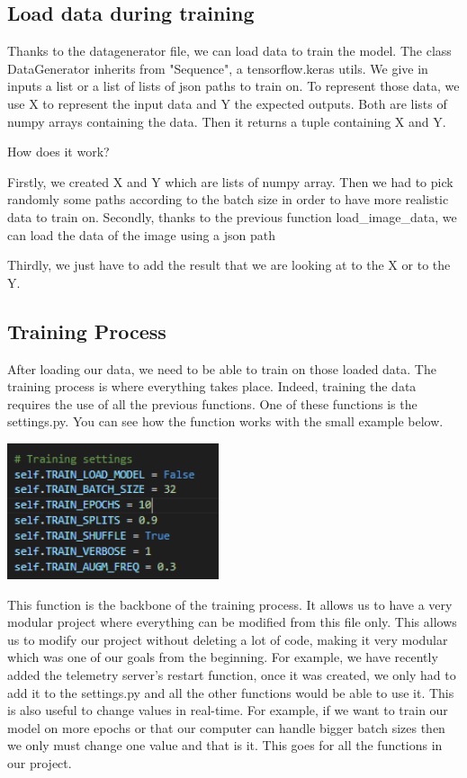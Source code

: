 \documentclass[12pt]{article}
\begin{document}
\subsection{Load data during training}
Thanks to the datagenerator file, we can load data to train the model. The class DataGenerator inherits from "Sequence", a tensorflow.keras utils. We give in inputs a list or a list of lists of json paths to train on. To represent those data, we use X to represent the input data and Y the expected outputs. Both are lists of numpy arrays containing the data. Then it returns a tuple containing X and Y.  

How does it work?  

Firstly, we created X and Y which are lists of numpy array. Then we had to pick randomly some paths according to the batch size in order to have more realistic data to train on. Secondly, thanks to the previous function load\_image\_data, we can load the data of the image using a json path

Thirdly, we just have to add the result that we are looking at to the X or to the Y.

\newpage 

\subsection{Training Process}

After loading our data, we need to be able to train on those loaded data. The training process is where everything takes place. Indeed, training the data requires the use of all the previous functions. One of these functions is the settings.py. You can see how the function works with the small example below.\\

\centerline{\includegraphics[height=4cm]{../../docs/setting-train.png}} 

This function is the backbone of the training process. It allows us to have a very modular project where everything can be modified from this file only. This allows us to modify our project without deleting a lot of code, making it very modular which was one of our goals from the beginning. For example, we have recently added the telemetry server's restart function, once it was created, we only had to add it to the settings.py and all the other functions would be able to use it.   
This is also useful to change values in real-time. For example, if we want to train our model on more epochs or that our computer can handle bigger batch sizes then we only must change one value and that is it. This goes for all the functions in our project. 
\end{document}
